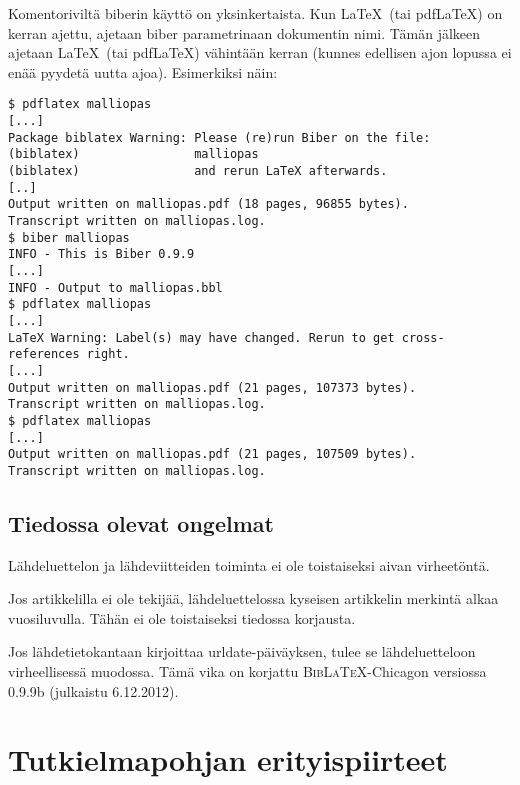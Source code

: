 \documentclass[utf8,bachelor]{gradu3}
\begin{document}
Komentoriviltä biberin käyttö on yksinkertaista.  Kun \LaTeX\ (tai
pdf\LaTeX) on kerran ajettu, ajetaan biber parametrinaan dokumentin
nimi.  Tämän jälkeen ajetaan \LaTeX\ (tai pdf\LaTeX) vähintään kerran
(kunnes edellisen ajon lopussa ei enää pyydetä uutta ajoa).
Esimerkiksi näin:

\begingroup\footnotesize
\begin{verbatim}
$ pdflatex malliopas
[...]
Package biblatex Warning: Please (re)run Biber on the file:
(biblatex)                malliopas
(biblatex)                and rerun LaTeX afterwards.
[..]
Output written on malliopas.pdf (18 pages, 96855 bytes).
Transcript written on malliopas.log.
$ biber malliopas
INFO - This is Biber 0.9.9
[...]
INFO - Output to malliopas.bbl
$ pdflatex malliopas
[...]
LaTeX Warning: Label(s) may have changed. Rerun to get cross-references right.
[...]
Output written on malliopas.pdf (21 pages, 107373 bytes).
Transcript written on malliopas.log.
$ pdflatex malliopas
[...]
Output written on malliopas.pdf (21 pages, 107509 bytes).
Transcript written on malliopas.log.
\end{verbatim}
\endgroup

\section{Tiedossa olevat ongelmat}

Lähdeluettelon ja lähdeviitteiden toiminta ei ole toistaiseksi aivan
virheetöntä.

Jos artikkelilla ei ole tekijää, lähdeluettelossa kyseisen artikkelin
merkintä alkaa vuosiluvulla.  Tähän ei ole toistaiseksi tiedossa
korjausta.

Jos lähdetietokantaan kirjoittaa urldate-päiväyksen, tulee se
lähdeluetteloon virheellisessä muodossa.  Tämä vika on korjattu
\textsc{Bib\LaTeX}-Chicagon versiossa 0.9.9b (julkaistu 6.12.2012).

\chapter{Tutkielmapohjan erityispiirteet}
\end{document}
